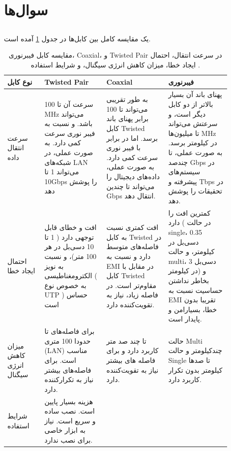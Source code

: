 \documentclass[12pt]{article}
\begin{document}
	\section{سوال‌ها}
	\subsection{}
	یک مقایسه کامل بین کابل‌ها در جدول \ref{tab:1} آمده است.
	\begin{center}
		\begin{table}[h]
			\caption{مقایسه کابل فیبرنوری، \textenglish{Coaxial}، و \textenglish{Twisted Pair}
			در سرعت انتقال، احتمال ایجاد خطا، میزان کاهش انرژی سیگنال، و شرایط استفاده 
			\cite{a1, a2, a3, a4, a5, a6, a7}.}
			\label{tab:1}
			\begin{tabular}{|p{0.15\linewidth}|p{0.25\linewidth}|p{0.25\linewidth}|p{0.25\linewidth}|}	
				\hline
				نوع کابل & \textenglish{Twisted Pair} & \textenglish{Coaxial} & فیبرنوری \\
				\hline
				سرعت انتقال داده &
				سرعت آن تا 100 MHz می‌تواند باشد. و نسبت به فیبر نوری سرعت کمی دارد. 
				به صورت عملی، در شبکه‌های LAN می‌‌تواند 1 تا 10Gbps را پوشش دهد &
				به طور تقریبی می‌تواند تا 100 برابر پهنای باند کابل Twisted برسد. 
				اما در برابر با فیبر نوری سرعت کمی دارد. به صورت عملی، 
				داده‌های دیجیتال را می‌تواند تا چندین Gbps انتقال دهد. &
				پهنای باند آن بسیار بالاتر از دو کابل دیگر است، و سرعتش می‌تواند 
				تا میلیون‌ها MHz در کیلومتر برسد. به صورت عملی، تا چندصد Gbps 
				در سیستم‌های پیشرفته و Tbps در تحقیقات را پوشش دهد. \\
				\hline
				احتمال ایجاد خطا &
				افت و خطای قابل توجهی دارد ( 1 تا 10 دسی‌بل در هر 100 متر)، 
				و نسبت به نویز الکترومغناطیسی ( به خصوص نوع UTP ) حساس است &
				افت کمتری نسبت به کابل Twisted در فاصله‌های متوسط دارد 
				و نسبت به EMI در مقابل با کابل Twisted مقاوم‌تر است. 
				در فاصله زیاد، نیاز به تقویت‌کننده دارد. &
				کمترین افت را دارد ( در حالت single، 0.35 دسی‌بل در کیلومتر، و حالت multi، 3 
				دسی‌بل در کیلومتر) و بخاطر نداشتن حساسیت نسبت به EMI تقریبا 
				بدون خطا، بسیارامن و پایدار است. \\
				\hline
				میزان کاهش انرژی سیگنال &
				برای فاصله‌های تا حدودا 100 متری (LAN) مناسب است.
				برای فاصله‌های بیشتر نیاز به تکرارکننده دارد. &
				تا چند صد متر کاربرد دارد و برای فاصله های بیشتر نیاز به تقویت‌کننده دارد. &
				حالت Multi چندکیلومتر و حالت Single تا صدها کیلومتر بدون تکرار کاربرد دارد. \\
				\hline
				شرایط استفاده &
				هزینه بسیار پایین است. نصب ساده و سریع است. نیاز به ابزار خاصی برای نصب ندارد. 

\end{tabular}
\end{table}
\end{center}
\end{document}
